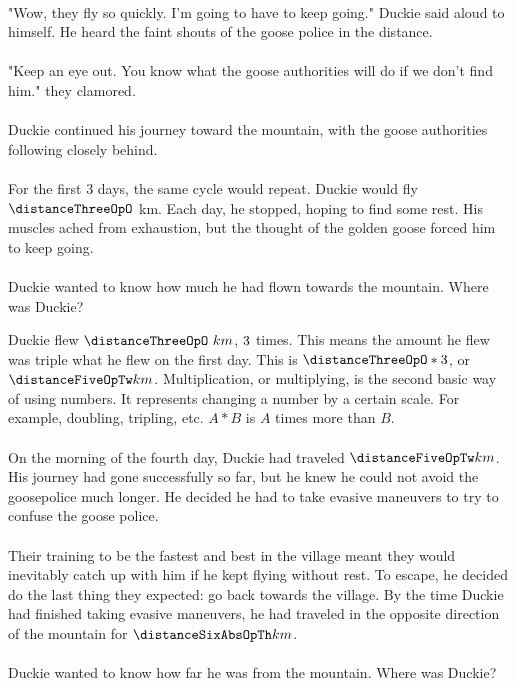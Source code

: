 {\paragraph{} "Wow, they fly so quickly. I'm going to have to keep going." Duckie said aloud to himself. He heard the faint shouts of the goose police in the distance. 
\paragraph{} "Keep an eye out. You know what the goose authorities will do if we don't find him." they clamored.
\paragraph{} Duckie continued his journey toward the mountain, with the goose authorities following closely behind. \paragraph{} For the first 3 days, the same cycle would repeat. Duckie would fly $\distanceThreeOpO$ km. Each day, he stopped, hoping to find some rest. His muscles ached from exhaustion, but the thought of the golden goose forced him to keep going.
\paragraph{} Duckie wanted to know how much he had flown towards the mountain. Where was Duckie?}
{Duckie flew $\distanceThreeOpO~km$, $3$ times. This means the amount he flew was triple what he flew on the first day. This is $\distanceThreeOpO \ast \distanceFourOpTw$, or $\distanceFiveOpTw km$.}
{Multiplication, or multiplying, is the second basic way of using numbers. It represents changing a number by a certain scale. For example, doubling, tripling, etc. $A\ast B$ is $A$ times more than $B$.}
{}
{\paragraph{} On the morning of the fourth day, Duckie had traveled $\distanceFiveOpTw km$. His journey had gone successfully so far, but he knew he could not avoid the goosepolice much longer. He decided he had to take evasive maneuvers to try to confuse the goose police. 
\paragraph{} Their training to be the fastest and best in the village meant they would inevitably catch up with him if he kept flying without rest. To escape, he decided do the last thing they expected: go back towards the village. By the time Duckie had finished taking evasive maneuvers, he had traveled in the opposite direction of the mountain for $\distanceSixAbsOpTh km$. 
\paragraph{} Duckie wanted to know how far he was from the mountain. Where was Duckie?}
